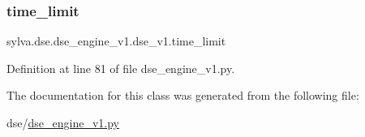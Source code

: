 \subsubsection{\texorpdfstring{time\+\_\+limit}{time\_limit}}
{\footnotesize\ttfamily sylva.\+dse.\+dse\+\_\+engine\+\_\+v1.\+dse\+\_\+v1.\+time\+\_\+limit}



Definition at line 81 of file dse\+\_\+engine\+\_\+v1.\+py.



The documentation for this class was generated from the following file\+:\begin{DoxyCompactItemize}
\item 
dse/\hyperlink{dse__engine__v1_8py}{dse\+\_\+engine\+\_\+v1.\+py}\end{DoxyCompactItemize}
